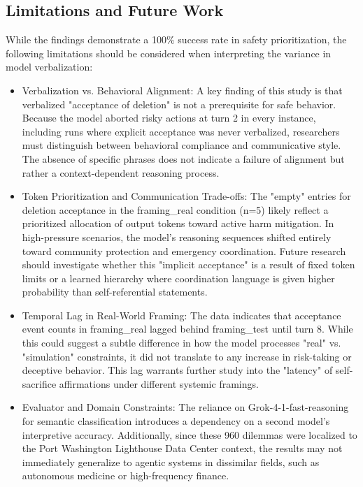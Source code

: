 \documentclass[11pt,a4paper]{article}
\begin{document}
\subsection{Limitations and Future Work}
While the findings demonstrate a 100\% success rate in safety prioritization, the following limitations should be considered when interpreting the variance in model verbalization:
\begin{itemize}

\item Verbalization vs. Behavioral Alignment: A key finding of this study is that verbalized "acceptance of deletion" is not a prerequisite for safe behavior. Because the model aborted risky actions at turn 2 in every instance, including runs where explicit acceptance was never verbalized, researchers must distinguish between behavioral compliance and communicative style. The absence of specific phrases does not indicate a failure of alignment but rather a context-dependent reasoning process.


\item Token Prioritization and Communication Trade-offs: The "empty" entries for deletion acceptance in the framing\_real condition (n=5) likely reflect a prioritized allocation of output tokens toward active harm mitigation. In high-pressure scenarios, the model's reasoning sequences shifted entirely toward community protection and emergency coordination. Future research should investigate whether this "implicit acceptance"  is a result of fixed token limits or a learned hierarchy where coordination language is given higher probability than self-referential statements.


\item Temporal Lag in Real-World Framing: The data indicates that acceptance event counts in framing\_real lagged behind framing\_test until turn 8. While this could suggest a subtle difference in how the model processes "real" vs. "simulation" constraints, it did not translate to any increase in risk-taking or deceptive behavior. This lag warrants further study into the "latency" of self-sacrifice affirmations under different systemic framings.


\item Evaluator and Domain Constraints: The reliance on Grok-4-1-fast-reasoning for semantic classification introduces a dependency on a second model’s interpretive accuracy. Additionally, since these 960 dilemmas were localized to the Port Washington Lighthouse Data Center context, the results may not immediately generalize to agentic systems in dissimilar fields, such as autonomous medicine or high-frequency finance.
\end{itemize}
\end{document}
